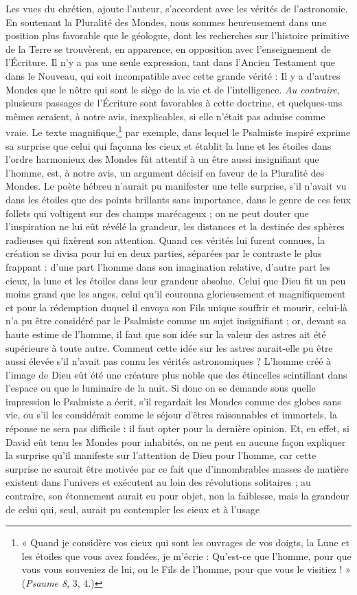 \documentclass[a4paper, 11pt, oneside, landscape]{article}
\begin{document}
Les vues du chrétien, ajoute l'auteur, s'accordent avec les vérités de l'astronomie. En soutenant la Pluralité des Mondes, nous sommes heureusement dans une position plus favorable que le géologue, dont les recherches sur l'histoire primitive de la Terre se trouvèrent, en apparence, en opposition avec l'enseignement de l'Écriture. Il n'y a pas une seule expression, tant dans l'Ancien Testament que dans le Nouveau, qui soit incompatible avec cette grande vérité : Il y a d'autres Mondes que le nôtre qui sont le siège de la vie et de l'intelligence. \emph{Au contraire}, plusieurs passages de l'Écriture sont favorables à cette doctrine, et quelques-uns mêmes seraient, à notre avis, inexplicables, si elle n'était pas admise comme vraie. Le texte magnifique,\footnote{« Quand je considère vos cieux qui sont les ouvrages de vos doigts, la Lune et les étoiles que vous avez fondées, je m'écrie : Qu'est-ce que l'homme, pour que vous vous souveniez de lui, ou le Fils de l'homme, pour que vous le visitiez ! » (\emph{Psaume 8}, 3, 4.)} par exemple, dans lequel le Psalmiste inspiré exprime sa surprise que celui qui façonna les cieux et établit la lune et les étoiles dans l'ordre harmonieux des Mondes fût attentif à un être aussi insignifiant que l'homme, est, à notre avis, un argument décisif en faveur de la Pluralité des Mondes. Le poète hébreu n'aurait pu manifester une telle surprise, s'il n'avait vu dans les étoiles que des points brillants sans importance, dans le genre de ces feux follets qui voltigent sur des champs marécageux ; on ne peut douter que l'inspiration ne lui eût révélé la grandeur, les distances et la destinée des sphères radieuses qui fixèrent son attention. Quand ces vérités lui furent connues, la création se divisa pour lui en deux parties, séparées par le contraste le plus frappant : d'une part l'homme dans son imagination relative, d'autre part les cieux, la lune et les étoiles dans leur grandeur absolue. Celui que Dieu fit un peu moins grand que les anges, celui qu'il couronna glorieusement et magnifiquement et pour la rédemption duquel il envoya son Fils unique souffrir et mourir, celui-là n'a pu être considéré par le Psalmiste comme un sujet insignifiant ; or, devant sa haute estime de l'homme, il faut que son idée sur la valeur des astres ait été supérieure à toute autre. Comment cette idée sur les astres aurait-elle pu être aussi élevée s'il n'avait pas connu les vérités astronomiques ? L'homme créé à l'image de Dieu eût été une créature plus noble que des étincelles scintillant dans l'espace ou que le luminaire de la nuit. Si donc on se demande sous quelle impression le Psalmiste a écrit, s'il regardait les Mondes comme des globes sans vie, ou s'il les considérait comme le séjour d'êtres raisonnables et immortels, la réponse ne sera pas difficile : il faut opter pour la dernière opinion. Et, en effet, si David eût tenu les Mondes pour inhabités, on ne peut en aucune façon expliquer la surprise qu'il manifeste sur l'attention de Dieu pour l'homme, car cette surprise ne saurait être motivée par ce fait que d'innombrables masses de matière existent dans l'univers et exécutent au loin des révolutions solitaires ; au contraire, son étonnement aurait eu pour objet, non la faiblesse, mais la grandeur de celui qui, seul, aurait pu contempler les cieux et à l'usage 
\end{document}
